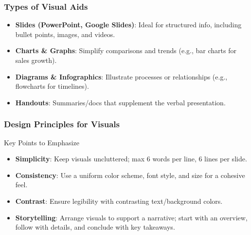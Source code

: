 \documentclass[aspectratio=169]{beamer}
\begin{document}
\begin{frame}[fragile]
    \frametitle{Types of Visual Aids}
    \begin{itemize}
        \item \textbf{Slides (PowerPoint, Google Slides)}: Ideal for structured info, including bullet points, images, and videos.
        \item \textbf{Charts \& Graphs}: Simplify comparisons and trends (e.g., bar charts for sales growth).
        \item \textbf{Diagrams \& Infographics}: Illustrate processes or relationships (e.g., flowcharts for timelines).
        \item \textbf{Handouts}: Summaries/docs that supplement the verbal presentation.
    \end{itemize}
\end{frame}

\begin{frame}[fragile]
    \frametitle{Design Principles for Visuals}
    \begin{block}{Key Points to Emphasize}
        \begin{itemize}
            \item \textbf{Simplicity}: Keep visuals uncluttered; max 6 words per line, 6 lines per slide.
            \item \textbf{Consistency}: Use a uniform color scheme, font style, and size for a cohesive feel.
            \item \textbf{Contrast}: Ensure legibility with contrasting text/background colors.
            \item \textbf{Storytelling}: Arrange visuals to support a narrative; start with an overview, follow with details, and conclude with key takeaways.
        \end{itemize}
    \end{block}
\end{frame}
\end{document}
